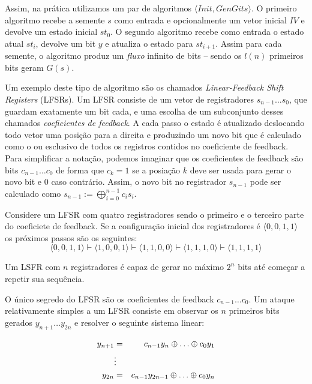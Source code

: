 Assim, na prática utilizamos um par de algoritmos $\langle Init, GenGits \rangle$.
O primeiro algoritmo recebe a semente $s$ como entrada e opcionalmente um vetor inicial $IV$ e devolve um estado inicial $st_0$.
O segundo algoritmo recebe como entrada o estado atual $st_i$, devolve um bit $y$ e atualiza o estado para $st_{i+1}$.
Assim para cada semente, o algoritmo produz um {\em fluxo} infinito de bits -- sendo os $l(n)$ primeiros bits geram $G(s)$.

Um exemplo deste tipo de algoritmo são os chamados {\em Linear-Feedback Shift Registers} (LFSRs).
Um LFSR consiste de um vetor de registradores $s_{n-1} \dots s_0$, que guardam exatamente um bit cada, e uma escolha de um subconjunto desses chamados {\em coeficientes de feedback}.
A cada passo o estado é atualizado deslocando todo vetor uma posição para a direita e produzindo um novo bit que é calculado como o ou esclusivo de todos os registros contidos no coeficiente de feedback.
Para simplificar a notação, podemos imaginar que os coeficientes de feedback são bits $c_{n-1} \dots c_0$ de forma que $c_k = 1$ se a posiação $k$ deve ser usada para gerar o novo bit e $0$ caso contrário.
Assim, o novo bit no registrador $s_{n-1}$ pode ser calculado como $s_{n-1} := \bigoplus_{i=0}^{n-1}c_is_i$.


\begin{example}
  Considere um LFSR com quatro registradores sendo o primeiro e o terceiro parte do coeficiete de feedback.
Se a configuração inicial dos registradores é $\langle 0,0,1,1 \rangle$ os próximos passos são os seguintes:
\begin{displaymath}
  \langle 0,0,1,1 \rangle \vdash
  \langle 1,0,0,1 \rangle \vdash 
  \langle 1,1,0,0 \rangle \vdash
  \langle 1,1,1,0 \rangle \vdash
  \langle 1,1,1,1 \rangle
\end{displaymath}
\end{example}

Um LSFR com $n$ registradores é capaz de gerar no máximo $2^n$ bits até começar a repetir sua sequência.

O único segredo do LFSR são os coeficientes de feedback $c_{n-1} \dots c_0$.
Um ataque relativamente simples a um LFSR consiste em observar os $n$ primeiros bits gerados $y_{n+1} \dots y_{2n}$ e resolver o seguinte sistema linear:

\begin{eqnarray*}
  y_{n+1} &    =   & c_{n-1}y_n \xor \dots \xor c_0 y_1\\
         & \vdots &  \\
  y_{2n}  &    =   & c_{n-1}y_{2n-1} \xor \dots \xor c_0 y_n\\      
\end{eqnarray*}

